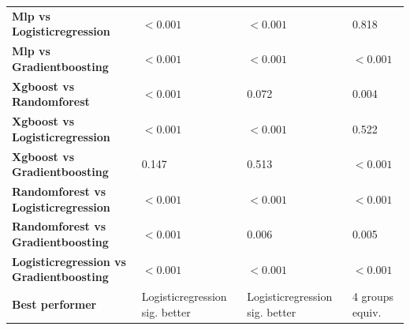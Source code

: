 \begin{table}[H]
{\begin{tabular}{llll}
        \textbf{Mlp vs Logisticregression} & $< 0.001$ & $< 0.001$ & 0.818 \\
        \textbf{Mlp vs Gradientboosting} & $< 0.001$ & $< 0.001$ & $< 0.001$ \\
        \textbf{Xgboost vs Randomforest} & $< 0.001$ & 0.072 & 0.004 \\
        \textbf{Xgboost vs Logisticregression} & $< 0.001$ & $< 0.001$ & 0.522 \\
        \textbf{Xgboost vs Gradientboosting} & 0.147 & 0.513 & $< 0.001$ \\
        \textbf{Randomforest vs Logisticregression} & $< 0.001$ & $< 0.001$ & $< 0.001$ \\
        \textbf{Randomforest vs Gradientboosting} & $< 0.001$ & 0.006 & 0.005 \\
        \textbf{Logisticregression vs Gradientboosting} & $< 0.001$ & $< 0.001$ & $< 0.001$ \\
        \textbf{Best performer} & Logisticregression sig. better & Logisticregression sig. better & 4 groups equiv. \\
        \bottomrule
    \end{tabular}}
\end{table}